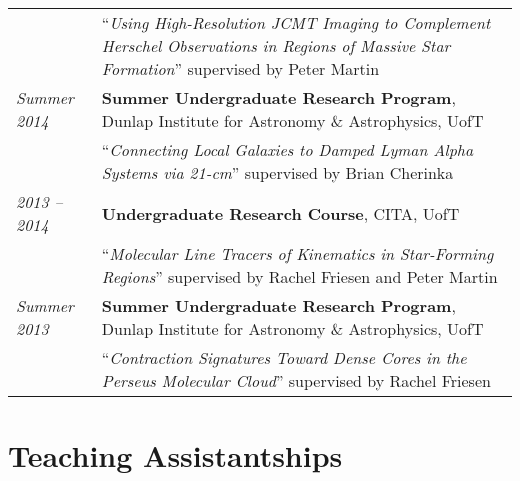 \documentclass[10pt]{res} %
\begin{document}
\begin{resume}
\begin{table}[h]
\begin{tabularx}{\textwidth}{ @{} p{6.5em} X @{} }
                                 & ``\textit{Using High-Resolution JCMT Imaging to Complement Herschel Observations in Regions of Massive Star Formation}'' supervised by Peter Martin \\
\textit{Summer 2014} & \textbf{Summer Undergraduate Research Program}, Dunlap Institute for Astronomy \& Astrophysics, UofT \\
                                 & ``\textit{Connecting Local Galaxies to Damped Lyman Alpha Systems via 21-cm}'' supervised by Brian Cherinka \\
\textit{2013 -- 2014} &\textbf{Undergraduate Research Course}, CITA, UofT \\
                                 & ``\textit{Molecular Line Tracers of Kinematics in Star-Forming Regions}'' supervised by Rachel Friesen and Peter Martin \\
\textit{Summer 2013} & \textbf{Summer Undergraduate Research Program}, Dunlap Institute for Astronomy \& Astrophysics, UofT \\
                                 & ``\textit{Contraction Signatures Toward Dense Cores in the Perseus Molecular Cloud}'' supervised by Rachel Friesen
\end{tabularx}
\end{table}


\section{\Large Teaching Assistantships}
\vspace{-5pt} %
\noindent\makebox[\linewidth]{\rule{\textwidth}{0.4pt}}
\vspace{-20pt} %


\end{resume}
\end{document}
